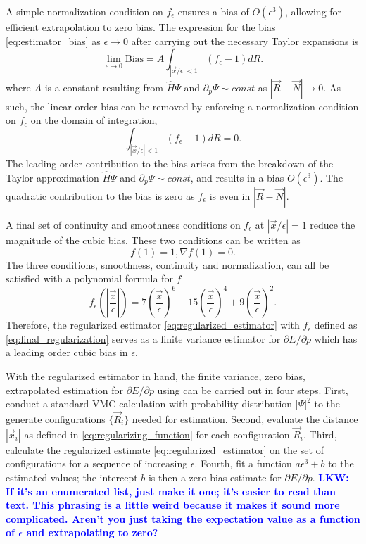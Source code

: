 \documentclass[twocolumn]{revtex4-1}
\newcommand{\lucas}[1]{\textbf{\textcolor{blue}{LKW: #1}}}
\begin{document}
A simple normalization condition on $f_\epsilon$ ensures a bias of $O(\epsilon^3)$, allowing for efficient extrapolation to zero bias.
The expression for the bias \eqref{eq:estimator_bias} as $\epsilon \rightarrow 0$ after carrying out the necessary Taylor expansions is
$$
\lim_{\epsilon\rightarrow 0}\text{Bias} =  A \int_{|\vec{x}/\epsilon|< 1} (f_\epsilon - 1) dR.
$$
where $A$ is a constant resulting from $\hat{H}\Psi$ and $\partial_p \Psi \sim const$ as $|\vec{R}-\vec{N}|\rightarrow 0$.
As such, the linear order bias can be removed by enforcing a normalization condition on $f_\epsilon$ on the domain of integration, 
\begin{equation}
\int_{|\vec{x}/\epsilon|< 1} (f_\epsilon - 1) dR = 0.
\label{eq:normalization_condition}
\end{equation}
The leading order contribution to the bias arises from the breakdown of the Taylor approximation $\hat{H}\Psi$ and $\partial_p \Psi \sim const$, and results in a bias $O(\epsilon^3)$.
The quadratic contribution to the bias is zero as $f_\epsilon$ is even in $|\vec{R}-\vec{N}|$.

A final set of continuity and smoothness conditions on $f_\epsilon$ at $|\vec{x}/\epsilon| = 1$ reduce the magnitude of the cubic bias.
These two conditions can be written as 
\begin{equation}
f(1) = 1, \nabla f(1) = 0.
\label{eq:smoothness_condition}
\end{equation}
The three conditions, smoothness, continuity and normalization, can all be satisfied with a polynomial formula for $f$
\begin{equation}
f_\epsilon(|\frac{\vec{x}}{\epsilon}|) = 7(\frac{\vec{x}}{\epsilon})^6 - 15(\frac{\vec{x}}{\epsilon})^4 + 9(\frac{\vec{x}}{\epsilon})^2.
\label{eq:final_regularization}
\end{equation}
Therefore, the regularized estimator \eqref{eq:regularized_estimator} with $f_\epsilon$ defined as \eqref{eq:final_regularization} serves as a finite variance estimator for $\partial E/\partial p$ which has a leading order cubic bias in $\epsilon$.

With the regularized estimator in hand, the finite variance, zero bias, extrapolated estimation for $\partial E/\partial p$ using can be carried out in four steps.
First, conduct a standard VMC calculation with probability distribution $|\Psi|^2$ to the generate configurations $\{\vec{R}_i\}$ needed for estimation.
Second, evaluate the distance $|\vec{x}_i|$ as defined in \eqref{eq:regularizing_function} for each configuration $\vec{R}_i$.
Third, calculate the regularized estimate \eqref{eq:regularized_estimator} on the set of configurations for a sequence of increasing $\epsilon$.
Fourth, fit a function $a\epsilon^3 + b$ to the estimated values; the intercept $b$ is then a zero bias estimate for $\partial E/\partial p.$
\lucas{If it's an enumerated list, just make it one; it's easier to read than text. This phrasing is a little weird because it makes it sound more complicated. Aren't you just taking the expectation value as a function of $\epsilon$ and extrapolating to zero?} 
\end{document}
